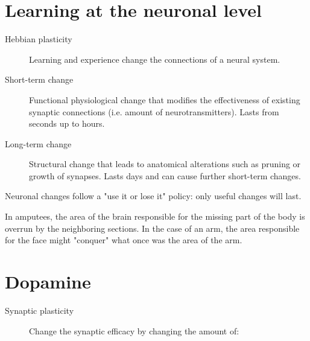 \section{Learning at the neuronal level}

\begin{description}
    \item[Hebbian plasticity] 
        Learning and experience change the connections of a neural system.

    \item[Short-term change] 
        Functional physiological change that modifies the effectiveness of existing synaptic connections (i.e. amount of neurotransmitters).
        Lasts from seconds up to hours.

    \item[Long-term change] 
        Structural change that leads to anatomical alterations such as pruning or growth of synapses.
        Lasts days and can cause further short-term changes.
\end{description}

\begin{remark}
    Neuronal changes follow a "use it or lose it" policy:
    only useful changes will last.
\end{remark}

\begin{example}
    In amputees, the area of the brain responsible for the missing part of the body is overrun by the neighboring sections.
    In the case of an arm, the area responsible for the face might "conquer" what once was the area of the arm.
\end{example}



\section{Dopamine}

\begin{description}
    \item[Synaptic plasticity]
        Change the synaptic efficacy by changing the amount of:
\end{description}


